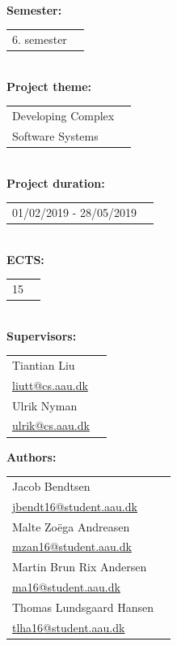 \newpage
\makeatother
\begin{minipage}[T]{0.45\textwidth}
 \begin{flushleft}
  \textbf{\normalsize{}}\\ \maketitle
  \textbf{\normalsize{Semester:}}\\
  \begin{tabular}{ll}
  \normalsize{6. semester}
  \end{tabular}\\
  \textbf{\normalsize{Project theme:}}\\
  \begin{tabular}{ll}
    \normalsize{Developing Complex}\\
    \normalsize{Software Systems}
  \end{tabular}\\
  \textbf{\normalsize{Project duration:}}\\
  \begin{tabular}{ll}
    \normalsize{01/02/2019 - 28/05/2019}
  \end{tabular}\\
  \textbf{\normalsize{ECTS:}}\\
  \begin{tabular}{ll}
  	\normalsize{15}
  \end{tabular}\\
  \textbf{\normalsize{Supervisors:}}\\
  \begin{tabular}{ll}
    \normalsize{Tiantian Liu}\\
    \href{mailto:liutt@cs.aau.dk}{liutt@cs.aau.dk}\\
    \normalsize{Ulrik Nyman}\\
    \href{mailto:ulrik@cs.aau.dk}{ulrik@cs.aau.dk}\\
  \end{tabular}

  \textbf{\normalsize{Authors:}}\\
  \begin{tabular}{ll}
   \normalsize{Jacob Bendtsen}\\
   \href{mailto:jbendt16@student.aau.dk}{jbendt16@student.aau.dk}\\
   \normalsize{Malte Zoëga Andreasen}\\
   \href{mailto:mzan16@student.aau.dk}{mzan16@student.aau.dk}\\
   \normalsize{Martin Brun Rix Andersen}\\
   \href{mailto:ma16@student.aau.dk}{ma16@student.aau.dk}\\
   \normalsize{Thomas Lundsgaard Hansen}\\
   \href{mailto:tlha16@student.aau.dk}{tlha16@student.aau.dk}\\
  \end{tabular}
 \end{flushleft}
\end{minipage}
